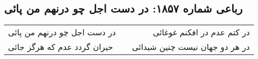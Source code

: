 \begin{center}
\section*{رباعی شماره ۱۸۵۷: در دست اجل چو درنهم من پائی}
\label{sec:1857}
\begin{longtable}{l p{0.5cm} r}
در دست اجل چو درنهم من پائی
&&
در کتم عدم در افکنم غوغائی
\\
حیران گردد عدم که هرگز جائی
&&
در هر دو جهان نیست چنین شیدائی
\\
\end{longtable}
\end{center}
